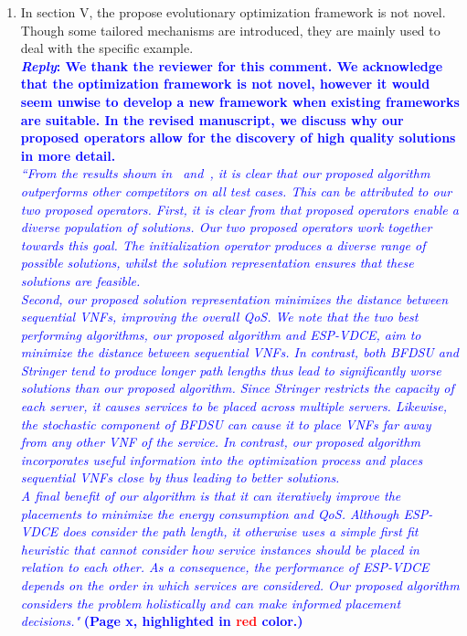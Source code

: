 \begin{enumerate}
      \item\textsf{In section V, the propose evolutionary optimization framework is not novel. Though some tailored mechanisms are introduced, they are mainly used to deal with the specific example.}\\
            \textcolor{blue}{\textbf{\textit{Reply}: We thank the reviewer for this comment. We acknowledge that the optimization framework is not novel, however it would seem unwise to develop a new framework when existing frameworks are suitable. In the revised manuscript, we discuss why our proposed operators allow for the discovery of high quality solutions in more detail.}}\\
            \textcolor{blue}{\textit{
                        ``From the results shown in~ and~, it is clear that our proposed algorithm outperforms other competitors on all test cases. This can be attributed to our two proposed operators. First, it is clear from  that proposed operators enable a diverse population of solutions. Our two proposed operators work together towards this goal. The initialization operator produces a diverse range of possible solutions, whilst the solution representation ensures that these solutions are feasible.\\
                        Second, our proposed solution representation minimizes the distance between sequential VNFs, improving the overall QoS. We note that the two best performing algorithms, our proposed algorithm and ESP-VDCE, aim to minimize the distance between sequential VNFs. In contrast, both BFDSU and Stringer tend to produce longer path lengths thus lead to significantly worse solutions than our proposed algorithm. Since Stringer restricts the capacity of each server, it causes services to be placed across multiple servers. Likewise, the stochastic component of BFDSU can cause it to place VNFs far away from any other VNF of the service. In contrast, our proposed algorithm incorporates useful information into the optimization process and places sequential VNFs close by thus leading to better solutions.\\
                        A final benefit of our algorithm is that it can iteratively improve the placements to minimize the energy consumption and QoS. Although ESP-VDCE does consider the path length, it otherwise uses a simple first fit heuristic that cannot consider how service instances should be placed in relation to each other. As a consequence, the performance of ESP-VDCE depends on the order in which services are considered. Our proposed algorithm considers the problem holistically and can make informed placement decisions."} \textbf{(Page x, highlighted in \textcolor{red}{red} color.)}}\\


\end{enumerate}

